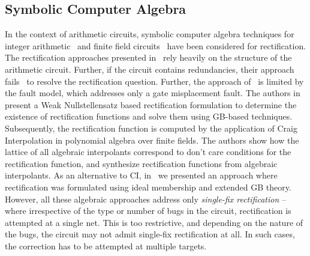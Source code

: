 \subsection{Symbolic Computer Algebra}

In the context of arithmetic circuits, symbolic computer algebra 
techniques for integer arithmetic~\cite{farimah:2016:1,farimah:2017:1,
MF_Rolf:ISVLSI18} and finite field circuits~\cite{Utkarsh:ETS19,
Utkarsh:VLSI18,Vkrao:FMCAD18} have been considered for rectification. 
The rectification approaches presented in~\cite{farimah:2016:1,farimah:2017:1} 
rely heavily on the structure of the arithmetic circuit. Further,
if the circuit contains redundancies, their approach 
fails~\cite{farimah_cex} to resolve the rectification question. 
Further, the approach of~\cite{MF_Rolf:ISVLSI18} is limited by the fault model,
which addresses only a gate misplacement fault.
The authors in~\cite{Utkarsh:ETS19,Utkarsh:VLSI18} present a Weak 
Nullstellensatz based rectification formulation to determine the existence of 
rectification functions and solve them using GB-based techniques. 
Subsequently, the rectification function is computed by the application of 
Craig Interpolation in polynomial algebra over finite fields. 
The authors show how the lattice of all algebraic interpolants 
correspond to don't care conditions for the rectification function, and synthesize
rectification functions from algebraic interpolants.
As an alternative to CI, in~\cite{Vkrao:FMCAD18} we presented an approach where
rectification was formulated using ideal membership and extended GB theory.
However, all these algebraic approaches address only {\it single-fix 
rectification} -- where irrespective of the type or number of bugs in the circuit, rectification is attempted at a single net. This is too restrictive, and depending on the nature of the bugs, the circuit may not admit single-fix rectification at all. In such cases, 
the correction has to be attempted at multiple targets.

